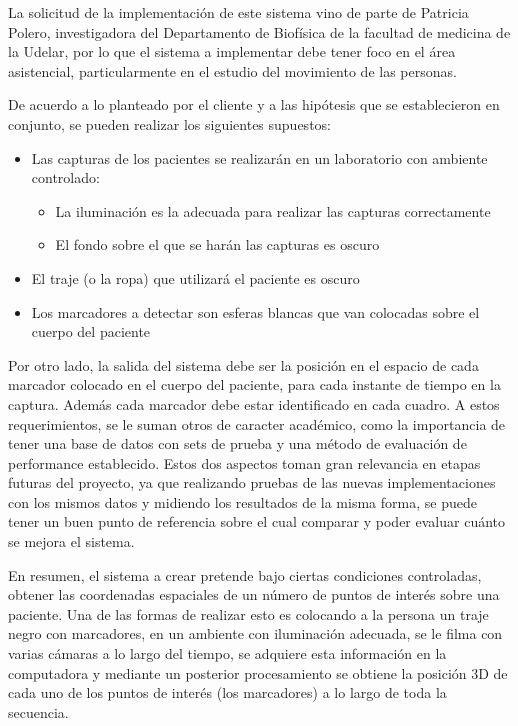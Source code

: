 La solicitud de la implementación de este sistema vino de parte de Patricia Polero, investigadora del Departamento de Biofísica de la facultad de medicina de la Udelar, por lo que el sistema a implementar debe tener foco en el área asistencial, particularmente en el estudio del movimiento de las personas.

De acuerdo a lo planteado por el cliente y a las hipótesis que se establecieron en conjunto, se pueden realizar los siguientes supuestos:
\begin{itemize}
\item Las capturas de los pacientes se realizarán en un laboratorio con ambiente controlado:
	\begin{itemize}
		 \item La iluminación es la adecuada para realizar las  capturas correctamente
		 \item El fondo sobre el que se harán las capturas es oscuro
	\end{itemize}
\item El traje (o la ropa) que utilizará el paciente es oscuro
\item Los marcadores a detectar son esferas blancas que van colocadas sobre el cuerpo del paciente
\end{itemize}

Por otro lado, la salida del sistema debe ser la posición en el espacio de cada marcador colocado en el cuerpo del paciente, para cada instante de tiempo en la captura. Además cada marcador debe estar identificado en cada cuadro. A estos requerimientos, se le suman otros de caracter académico, como la importancia de tener una base de datos con sets de prueba y una método de evaluación de performance establecido. Estos dos aspectos toman gran relevancia en etapas futuras del proyecto, ya que realizando pruebas de las nuevas implementaciones con los mismos datos y midiendo los resultados de la misma forma, se puede tener un buen punto de referencia sobre el cual comparar y poder evaluar cuánto se mejora el sistema.

En resumen, el sistema a crear pretende bajo ciertas condiciones controladas, obtener las coordenadas espaciales de un número de puntos de interés sobre una paciente. Una de las formas de realizar esto es colocando a la persona un traje negro con marcadores, en un ambiente con iluminación adecuada, se le filma con varias cámaras a lo largo del tiempo, se adquiere esta información en la computadora y mediante un posterior procesamiento se obtiene la posición 3D de cada uno de los puntos de interés (los marcadores) a lo largo de toda la secuencia.


